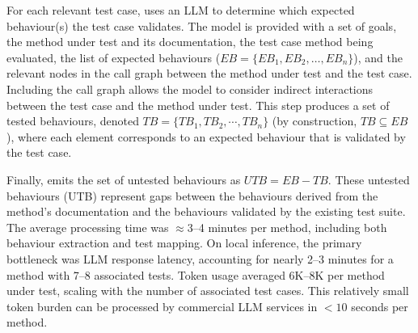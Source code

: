 For each relevant test case, \toolname{} uses an LLM to determine which expected behaviour(s) the test case validates.
The model is provided with a set of goals, the method under test and its documentation, the test case method being evaluated, the list of expected behaviours ($EB = \{EB_1, EB_2, \dots, EB_n\}$), and the relevant nodes in the call graph between the method under test and the test case. 
Including the call graph allows the model to consider indirect interactions between the test case and the method under test.
This step produces a set of tested behaviours, denoted $TB = \{TB_1, TB_2,\cdots, TB_n\}$ (by construction, $TB \subseteq EB$), where each element corresponds to an expected behaviour that is validated by the test case.

Finally, \toolname{} emits the set of untested behaviours as $UTB = EB - TB$.
These untested behaviours (UTB) represent gaps between the behaviours derived from the method's documentation and the behaviours validated by the existing test suite. 
The average processing time was $\approx$3--4 minutes per method, including both behaviour extraction and test mapping. On local inference, the primary bottleneck was LLM response latency, accounting for nearly 2--3 minutes for a method with 7--8 associated tests. Token usage averaged 6K--8K per method under test, scaling with the number of associated test cases. 
This relatively small token burden can be processed by commercial LLM services in $<10$ seconds per method.




\endinput 

\subsection{Strengthening Test Suites}
\label{sec:test-generator}

Given a method, its documentation, and a list of the expected behaviours for the method that are not currently tested, \toolname generates currently-missing test cases.
To improve the utility of the generated test cases, each test both compiles and tries to look similar in style to the existing test cases for the method.
Figure~\ref{fig:toolGenerator} captures how \toolname generate test cases that strengthen the existing developer-written test suite by validating untested expected behaviours.
For each untested expected behaviour $UTB$, the test suite strengthener performs two tasks: first, a candidate test case is generated; second, the candidate test case is validated to ensure it is syntactically valid.

